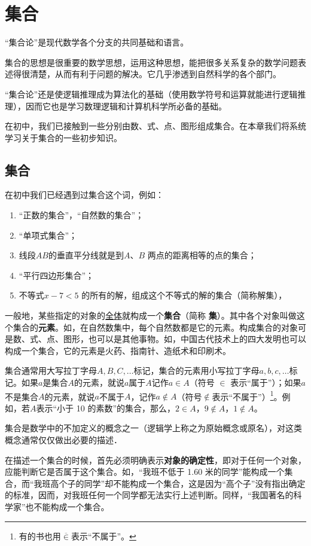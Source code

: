 \chapter{集合}

“集合论”是现代数学各个分支的共同基础和语言。

集合的思想是很重要的数学思想，运用这种思想，能把很多关系复杂的数学问题表述得很清楚，从而有利于问题的解决。它几乎渗透到自然科学的各个部门。

“集合论”还是使逻辑推理成为算法化的基础（使用数学符号和运算就能进行逻辑推理），因而它也是学习数理逻辑和计算机科学所必备的基础。

在初中，我们已接触到一些分别由数、式、点、图形组成集合。在本章我们将系统学习关于集合的一些初步知识。

\section{集合}

在初中我们已经遇到过集合这个词，例如：
\begin{enumerate}[(1)]
\item “正数的集合”，“自然数的集合”；
\item “单项式集合”；
\item 线段$AB$的垂直平分线就是到$A$、$B$ 两点的距离相等的点的集合；
\item “平行四边形集合”；
\item 不等式$x- 7 < 5$ 的所有的解，组成这个不等式的解的集合（简称解集），
\end{enumerate}


一般地，某些指定的对象的\underline{全体}就构成一个\textbf{集合}（简称
\textbf{集}）。其中各个对象叫做这个集合的\textbf{元素}。如，在自然数集中，每个自然数都是它的元素。构成集合的对象可是数、式、点、图形，也可以是其他事物。如，中国古代技术上的四大发明也可以构成一个集合，它的元素是火药、指南针、造纸术和印刷术。

集合通常用大写拉丁字母$A,B,C,\ldots$标记，集合的元素用小写拉丁字母$a,b,c,\ldots$标记。如果$a$是集合$A$的元素，就说$a$属于$A$记作$a\in A$（符号 $\in$ 表示“属于”）；如果$a$不是集合$A$的元素，就说$a$不属于$A$，记作$a\notin A$（符号$\notin$表示“不属于”）\footnote{有的书也用$\overline{\in}$表示“不属于”。}。例如，若$A$表示“小于 10 的素数”的集合，那么，$2\in A$，$9\notin A$，$1\notin A$。

集合是数学中的不加定义的概念之一（逻辑学上称之为原始概念或原名），对这类概念通常仅仅做出必要的描述．

在描述一个集合的时候，首先必须明确表示\textbf{对象的确定性}，即对于任何一个对象，应能判断它是否属于这个集合。如，“我班不低于 1.60 米的同学”能构成一个集合，而“我班高个子的同学”却不能构成一个集合，这是因为“高个子”没有指出确定的标准，因而，对我班任何一个同学都无法实行上述判断。同样，“我国著名的科学家”也不能构成一个集合。

